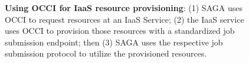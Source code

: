 \documentclass[10pt,conference,final,letterpaper,twoside,twocolumn,]{IEEEtran}
\newcommand{\T}[1]{\texttt{#1}}
\newcommand{\B}[1]{\textbf{#1}}
\begin{document}

\begin{figure}[htb]
 \caption{\footnotesize\label{fig:arch2} \B{Using OCCI for IaaS resource provisioning}: 
    (1) SAGA uses OCCI to request resources at an IaaS Service; 
    (2) the IaaS service uses OCCI to provision those resources 
         with a standardized job submission endpoint; 
    then 
    (3) SAGA uses the respective job submission protocol to utilize 
    the provisioned resources.}
\end{figure}



\end{document}
